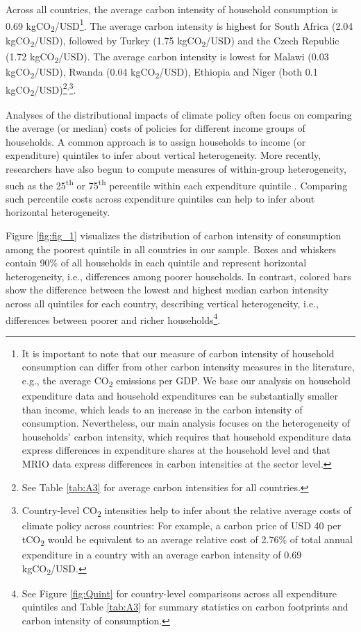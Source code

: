 \documentclass[12pt, a4paper]{article}
\begin{document}
Across all countries, the average carbon intensity of household consumption is 0.69 kgCO\textsubscript{2}/USD\footnote{It is important to note that our measure of carbon intensity of household consumption can differ from other carbon intensity measures in the literature, e.g., the average CO\textsubscript{2} emissions per GDP.  We base our analysis on household expenditure data and household expenditures can be substantially smaller than income, which leads to an increase in the carbon intensity of consumption. Nevertheless, our main analysis focuses on the heterogeneity of households' carbon intensity, which requires that household expenditure data express differences in expenditure shares at the household level and that MRIO data express differences in carbon intensities at the sector level.}. The average carbon intensity is highest for South Africa (2.04 kgCO\textsubscript{2}/USD), followed by Turkey (1.75 kgCO\textsubscript{2}/USD) and the Czech Republic (1.72 kgCO\textsubscript{2}/USD). The average carbon intensity is lowest for Malawi (0.03 kgCO\textsubscript{2}/USD), Rwanda (0.04 kgCO\textsubscript{2}/USD), Ethiopia and Niger (both 0.1 kgCO\textsubscript{2}/USD)\footnote{See Table \ref{tab:A3} for average carbon intensities for all countries.}\textsuperscript{,}\footnote{Country-level CO\textsubscript{2} intensities help to infer about the relative average costs of climate policy across countries: For example, a carbon price of USD 40 per tCO\textsubscript{2} \autocite{Stiglitz.2017} would be equivalent to an average relative cost of 2.76\% of total annual expenditure in a country with an average carbon intensity of 0.69 kgCO\textsubscript{2}/USD.}.

Analyses of the distributional impacts of climate policy often focus on comparing the average (or median) costs of policies for different income groups of households. A common approach is to assign households to income (or expenditure) quintiles to infer about vertical heterogeneity. More recently, researchers have also begun to compute measures of within-group heterogeneity, such as the 25\textsuperscript{th} or 75\textsuperscript{th} percentile within each expenditure quintile \autocite{Cronin.2019, Missbach.2024}. Comparing such percentile costs across expenditure quintiles can help to infer about horizontal heterogeneity.

Figure \ref{fig:fig_1} visualizes the distribution of carbon intensity of consumption among the poorest quintile in all countries in our sample. Boxes and whiskers contain 90\% of all households in each quintile and represent horizontal heterogeneity, i.e., differences among poorer households. In contrast, colored bars show the difference between the lowest and highest median carbon intensity across all quintiles for each country, describing vertical heterogeneity, i.e., differences between poorer and richer households\footnote{See Figure \ref{fig:Quint} for country-level comparisons across all expenditure quintiles and Table \ref{tab:A3} for summary statistics on carbon footprints and carbon intensity of consumption.}.
\end{document}
